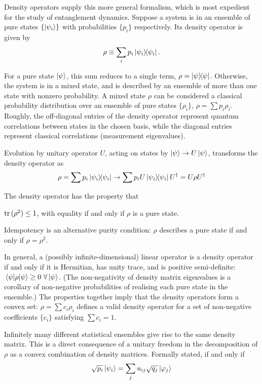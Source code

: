 \documentclass[10pt]{article}
\begin{document}
Density operators supply this more general formalism, which is most expedient for the study of entanglement dynamics. Suppose a system is in an ensemble of pure states $\{\ket{\psi_i}\}$ with probabilities $\{p_i\}$ respectively. Its density operator is given by
\begin{equation}
\rho \equiv \sum_i p_i \dyad{\psi_i}.
\end{equation}

For a pure state $\ket{\psi}$, this sum reduces to a single term, $\rho = \dyad{\psi}$. Otherwise, the system is in a mixed state, and is described by an ensemble of more than one state with nonzero probability. A mixed state $\rho$ can be considered a classical probability distribution over an ensemble of pure states $\{\rho_i\}$, $\rho = \sum p_i \rho_i$. Roughly, the off-diagonal entries of the density operator represent quantum correlations between states in the chosen basis, while the diagonal entries represent classical correlations (measurement eigenvalues). 

Evolution by unitary operator $U$, acting on states by $\ket{\psi}\rightarrow U\ket{\psi}$, transforms the density operator as
\begin{equation}
\rho = \sum p_i \dyad{\psi_i} \rightarrow \sum p_i U \dyad{\psi_i} U^\dagger = U \rho U^\dagger
\end{equation}

The density operator has the property that
\begin{displayquote}
$\trace{(\rho^2)} \leq 1$, with equality if and only if $\rho$ is a pure state. 
\end{displayquote}

Idempotency is an alternative purity condition: $\rho$ describes a pure state if and only if $\rho = \rho^2$. 

In general, a (possibly infinite-dimensional) linear operator is a density operator if and only if it is Hermitian, has unity trace, and is positive semi-definite: $\ev{\rho}{\psi} \geq 0 \ \forall \ket{\psi}$. (The non-negativity of density matrix eigenvalues is a corollary of non-negative probabilities of realising each pure state in the ensemble.) The properties together imply that the density operators form a convex set: $\rho = \sum c_i \rho_i$ defines a valid density operator for a set of non-negative coefficients $\{c_i\}$ satisfying $\sum c_i = 1$. 

Infinitely many different statistical ensembles give rise to the same density matrix. This is a direct consequence of a unitary freedom in the decomposition of $\rho$ as a convex combination of density matrices. Formally stated, if and only if
\begin{equation}
\sqrt{p_i} \ket{\psi_i} = \sum_j u_{ij} \sqrt{q_j} \ket{\varphi_j}
\end{equation}
\end{document}
